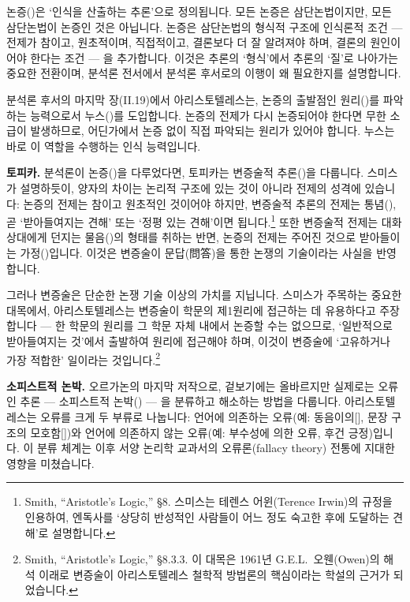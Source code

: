 \documentclass[12pt, a4paper]{article}
\begin{document}
논증()은 `인식을 산출하는 추론'으로 정의됩니다. 모든 논증은 삼단논법이지만, 모든 삼단논법이 논증인 것은 아닙니다. 논증은 삼단논법의 형식적 구조에 인식론적 조건 --- 전제가 참이고, 원초적이며, 직접적이고, 결론보다 더 잘 알려져야 하며, 결론의 원인이어야 한다는 조건 --- 을 추가합니다. 이것은 추론의 `형식'에서 추론의 `질'로 나아가는 중요한 전환이며, 분석론 전서에서 분석론 후서로의 이행이 왜 필요한지를 설명합니다.

분석론 후서의 마지막 장(II.19)에서 아리스토텔레스는, 논증의 출발점인 원리()를 파악하는 능력으로서 누스()를 도입합니다. 논증의 전제가 다시 논증되어야 한다면 무한 소급이 발생하므로, 어딘가에서 논증 없이 직접 파악되는 원리가 있어야 합니다. 누스는 바로 이 역할을 수행하는 인식 능력입니다.

\textbf{토피카.} 분석론이 논증()을 다루었다면, 토피카는 변증술적 추론()을 다룹니다. 스미스가 설명하듯이, 양자의 차이는 논리적 구조에 있는 것이 아니라 전제의 성격에 있습니다: 논증의 전제는 참이고 원초적인 것이어야 하지만, 변증술적 추론의 전제는 통념(), 곧 `받아들여지는 견해' 또는 `정평 있는 견해'이면 됩니다.\footnote{Smith, ``Aristotle's Logic,'' §8. 스미스는 테렌스 어윈(Terence Irwin)의 규정을 인용하여, 엔독사를 `상당히 반성적인 사람들이 어느 정도 숙고한 후에 도달하는 견해'로 설명합니다.} 또한 변증술적 전제는 대화 상대에게 던지는 물음()의 형태를 취하는 반면, 논증의 전제는 주어진 것으로 받아들이는 가정()입니다. 이것은 변증술이 문답(問答)을 통한 논쟁의 기술이라는 사실을 반영합니다.

그러나 변증술은 단순한 논쟁 기술 이상의 가치를 지닙니다. 스미스가 주목하는 중요한 대목에서, 아리스토텔레스는 변증술이 학문의 제1원리에 접근하는 데 유용하다고 주장합니다 --- 한 학문의 원리를 그 학문 자체 내에서 논증할 수는 없으므로, `일반적으로 받아들여지는 것'에서 출발하여 원리에 접근해야 하며, 이것이 변증술에 `고유하거나 가장 적합한' 일이라는 것입니다.\footnote{Smith, ``Aristotle's Logic,'' §8.3.3. 이 대목은 1961년 G.E.L.\ 오웬(Owen)의 해석 이래로 변증술이 아리스토텔레스 철학적 방법론의 핵심이라는 학설의 근거가 되었습니다.}

\textbf{소피스트적 논박.} 오르가논의 마지막 저작으로, 겉보기에는 올바르지만 실제로는 오류인 추론 --- 소피스트적 논박() --- 을 분류하고 해소하는 방법을 다룹니다. 아리스토텔레스는 오류를 크게 두 부류로 나눕니다: 언어에 의존하는 오류(예: 동음이의[], 문장 구조의 모호함[])와 언어에 의존하지 않는 오류(예: 부수성에 의한 오류, 후건 긍정)입니다. 이 분류 체계는 이후 서양 논리학 교과서의 오류론(fallacy theory) 전통에 지대한 영향을 미쳤습니다.
\end{document}
